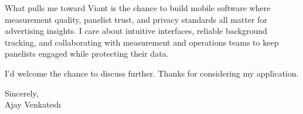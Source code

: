 \documentclass[letterpaper,11pt]{article}
\begin{document}
What pulls me toward Viant is the chance to build mobile software where measurement quality, panelist trust, and privacy standards all matter for advertising insights. I care about intuitive interfaces, reliable background tracking, and collaborating with measurement and operations teams to keep panelists engaged while protecting their data.

I'd welcome the chance to discuss further. Thanks for considering my application.

\vspace{12pt}
Sincerely, \\
Ajay Venkatesh
\end{document}
